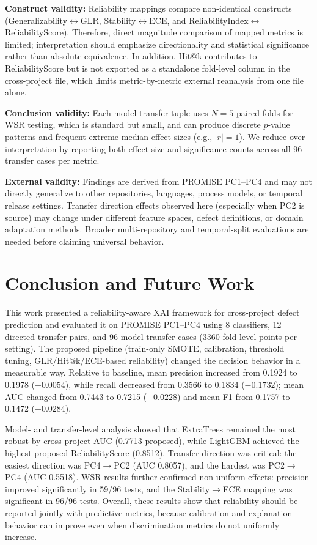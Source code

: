 \documentclass[conference]{IEEEtran}
\begin{document}
\textbf{Construct validity:} Reliability mappings compare non-identical constructs (Generalizability\(\leftrightarrow\)GLR, Stability\(\leftrightarrow\)ECE, and ReliabilityIndex\(\leftrightarrow\)ReliabilityScore). Therefore, direct magnitude comparison of mapped metrics is limited; interpretation should emphasize directionality and statistical significance rather than absolute equivalence. In addition, Hit@k contributes to ReliabilityScore but is not exported as a standalone fold-level column in the cross-project file, which limits metric-by-metric external reanalysis from one file alone.

\textbf{Conclusion validity:} Each model-transfer tuple uses \(N=5\) paired folds for WSR testing, which is standard but small, and can produce discrete \(p\)-value patterns and frequent extreme median effect sizes (e.g., \(|r|=1\)). We reduce over-interpretation by reporting both effect size and significance counts across all 96 transfer cases per metric.

\textbf{External validity:} Findings are derived from PROMISE PC1--PC4 and may not directly generalize to other repositories, languages, process models, or temporal release settings. Transfer direction effects observed here (especially when PC2 is source) may change under different feature spaces, defect definitions, or domain adaptation methods. Broader multi-repository and temporal-split evaluations are needed before claiming universal behavior.

\section{Conclusion and Future Work}
This work presented a reliability-aware XAI framework for cross-project defect prediction and evaluated it on PROMISE PC1--PC4 using 8 classifiers, 12 directed transfer pairs, and 96 model-transfer cases (3360 fold-level points per setting). The proposed pipeline (train-only SMOTE, calibration, threshold tuning, GLR/Hit@k/ECE-based reliability) changed the decision behavior in a measurable way. Relative to baseline, mean precision increased from 0.1924 to 0.1978 (\(+0.0054\)), while recall decreased from 0.3566 to 0.1834 (\(-0.1732\)); mean AUC changed from 0.7443 to 0.7215 (\(-0.0228\)) and mean F1 from 0.1757 to 0.1472 (\(-0.0284\)).

Model- and transfer-level analysis showed that ExtraTrees remained the most robust by cross-project AUC (0.7713 proposed), while LightGBM achieved the highest proposed ReliabilityScore (0.8512). Transfer direction was critical: the easiest direction was PC4\(\rightarrow\)PC2 (AUC 0.8057), and the hardest was PC2\(\rightarrow\)PC4 (AUC 0.5518). WSR results further confirmed non-uniform effects: precision improved significantly in 59/96 tests, and the Stability\(\rightarrow\)ECE mapping was significant in 96/96 tests. Overall, these results show that reliability should be reported jointly with predictive metrics, because calibration and explanation behavior can improve even when discrimination metrics do not uniformly increase.
\end{document}
